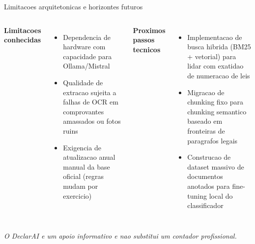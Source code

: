 \documentclass[aspectratio=169,12pt]{beamer}
\begin{document}
\begin{frame}{Limitacoes arquitetonicas e horizontes futuros}
\begin{columns}[T]
  \textcolor{declaraOrange}{\textbf{Limitacoes conhecidas}}\\[0.3cm]
  \begin{itemize}\small
    \item Dependencia de hardware com capacidade para Ollama/Mistral
    \item Qualidade de extracao sujeita a falhas de OCR em comprovantes amassados ou fotos ruins
    \item Exigencia de atualizacao anual manual da base oficial (regras mudam por exercicio)
  \end{itemize}
  \textcolor{declaraOrange}{\textbf{Proximos passos tecnicos}}\\[0.3cm]
  \begin{itemize}\small
    \item Implementacao de busca hibrida (BM25 + vetorial) para lidar com exatidao de numeracao de leis
    \item Migracao de chunking fixo para chunking semantico baseado em fronteiras de paragrafos legais
    \item Construcao de dataset massivo de documentos anotados para fine-tuning local do classificador
  \end{itemize}
\end{columns}
\vspace{0.4cm}
\begin{center}
  \small\color{declaraGray}\textit{O DeclarAI e um apoio informativo e nao substitui um contador profissional.}
\end{center}
\end{frame}
\end{document}
